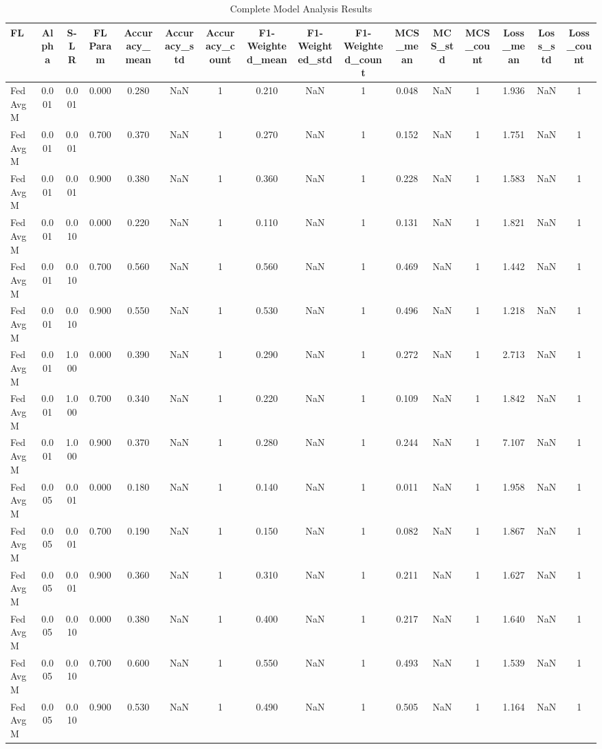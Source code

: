\begin{table}[htbp]
\caption{Complete Model Analysis Results}
\label{tab:all_models}
\begin{tabular}{lccccccccccccccc}
\toprule
FL & Alpha & S-LR & FL Param & Accuracy_mean & Accuracy_std & Accuracy_count & F1-Weighted_mean & F1-Weighted_std & F1-Weighted_count & MCS_mean & MCS_std & MCS_count & Loss_mean & Loss_std & Loss_count \\
\midrule
FedAvgM & 0.001 & 0.001 & 0.000 & 0.280 & NaN & 1 & 0.210 & NaN & 1 & 0.048 & NaN & 1 & 1.936 & NaN & 1 \\
FedAvgM & 0.001 & 0.001 & 0.700 & 0.370 & NaN & 1 & 0.270 & NaN & 1 & 0.152 & NaN & 1 & 1.751 & NaN & 1 \\
FedAvgM & 0.001 & 0.001 & 0.900 & 0.380 & NaN & 1 & 0.360 & NaN & 1 & 0.228 & NaN & 1 & 1.583 & NaN & 1 \\
FedAvgM & 0.001 & 0.010 & 0.000 & 0.220 & NaN & 1 & 0.110 & NaN & 1 & 0.131 & NaN & 1 & 1.821 & NaN & 1 \\
FedAvgM & 0.001 & 0.010 & 0.700 & 0.560 & NaN & 1 & 0.560 & NaN & 1 & 0.469 & NaN & 1 & 1.442 & NaN & 1 \\
FedAvgM & 0.001 & 0.010 & 0.900 & 0.550 & NaN & 1 & 0.530 & NaN & 1 & 0.496 & NaN & 1 & 1.218 & NaN & 1 \\
FedAvgM & 0.001 & 1.000 & 0.000 & 0.390 & NaN & 1 & 0.290 & NaN & 1 & 0.272 & NaN & 1 & 2.713 & NaN & 1 \\
FedAvgM & 0.001 & 1.000 & 0.700 & 0.340 & NaN & 1 & 0.220 & NaN & 1 & 0.109 & NaN & 1 & 1.842 & NaN & 1 \\
FedAvgM & 0.001 & 1.000 & 0.900 & 0.370 & NaN & 1 & 0.280 & NaN & 1 & 0.244 & NaN & 1 & 7.107 & NaN & 1 \\
FedAvgM & 0.005 & 0.001 & 0.000 & 0.180 & NaN & 1 & 0.140 & NaN & 1 & 0.011 & NaN & 1 & 1.958 & NaN & 1 \\
FedAvgM & 0.005 & 0.001 & 0.700 & 0.190 & NaN & 1 & 0.150 & NaN & 1 & 0.082 & NaN & 1 & 1.867 & NaN & 1 \\
FedAvgM & 0.005 & 0.001 & 0.900 & 0.360 & NaN & 1 & 0.310 & NaN & 1 & 0.211 & NaN & 1 & 1.627 & NaN & 1 \\
FedAvgM & 0.005 & 0.010 & 0.000 & 0.380 & NaN & 1 & 0.400 & NaN & 1 & 0.217 & NaN & 1 & 1.640 & NaN & 1 \\
FedAvgM & 0.005 & 0.010 & 0.700 & 0.600 & NaN & 1 & 0.550 & NaN & 1 & 0.493 & NaN & 1 & 1.539 & NaN & 1 \\
FedAvgM & 0.005 & 0.010 & 0.900 & 0.530 & NaN & 1 & 0.490 & NaN & 1 & 0.505 & NaN & 1 & 1.164 & NaN & 1 \\

\end{tabular}
\end{table}
